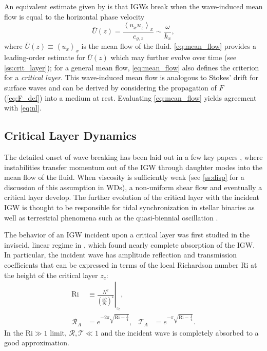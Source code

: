 \documentclass[
        fleqn,
        usenatbib,
    ]{mnras}
\newcommand*{\pd}[2]{\frac{\partial#1}{\partial#2}}
\newcommand*{\at}[1]{\left.#1\right|}
\newcommand*{\ev}[1]{\left\langle#1\right\rangle}
\newcommand*{\p}[1]{\left(#1\right)}
\begin{document}
An equivalent estimate given by \citep{eliassen_palm_cite,sutherland0} is that
IGWs break when the wave-induced mean flow is equal to the horizontal phase
velocity
\begin{equation}
    \overline{U}(z) = \frac{\ev{u_{x}u_{z}}_x}{c_{g,z}} \sim
        \frac{\omega}{k_x},\label{eq:mean_flow}
\end{equation}
where $\bar{U}(z) \equiv \ev{u_x}_x$ is the mean flow of the fluid.
\autoref{eq:mean_flow} provides a leading-order estimate for $\bar{U}(z)$ which
may further evolve over time (see \autoref{ss:crit_layer}); for a general mean
flow, \autoref{eq:mean_flow} also defines the criterion for a \emph{critical
layer}. This wave-induced mean flow is analogous to Stokes' drift for surface
waves and can be derived by considering the propagation of $F$
(\autoref{eq:F_def}) into a medium at rest. Evaluating \autoref{eq:mean_flow} yields
agreement with \autoref{eq:nl}.

\subsection{Critical Layer Dynamics}\label{ss:crit_layer}


The detailed onset of wave breaking has been laid out in a few key papers
\citep{drazin, klostermeyer, winters1994}, where instabilities transfer momentum
out of the IGW through daughter modes into the mean flow of the fluid. When
viscosity is sufficiently weak (see \autoref{ss:disp} for a discussion of this
assumption in WDs), a non-uniform shear flow and eventually a critical layer
develop. The further evolution of the critical layer with the incident IGW is
thought to be responsible for tidal synchronization in stellar binaries
\citep{zahn75,gn89} as well as terrestrial phenomena such as the quasi-biennial
oscillation \citep{lindzen_qbo}.

The behavior of an IGW incident upon a critical layer was first studied in the
inviscid, linear regime in \citep{booker_bretherton}, which found nearly
complete absorption of the IGW\@. In particular, the incident wave has amplitude
reflection and transmission coefficients that can be expressed in terms of the
local Richardson number Ri at the height of the critical layer $z_c$:
\begin{align}
    \mathrm{Ri} &\equiv \at{\frac{N^2}{\p{\pd{\overline{U}}{z}}^2}}_{z_c},
        \label{eq:ri_def}\\
    \mathcal{R}_A &= e^{-2\pi \sqrt{\mathrm{Ri} - \frac{1}{4}}}, &
    \mathcal{T}_A &= e^{-\pi \sqrt{\mathrm{Ri} - \frac{1}{4}}}.
        \label{eq:crit_coeffs}
\end{align}
In the $\mathrm{Ri} \gg 1$ limit, $\mathcal{R}, \mathcal{T} \ll 1$
and the incident wave is completely absorbed to a good approximation.
\end{document}
